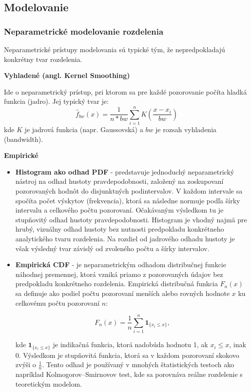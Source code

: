 \subsection{Modelovanie}

\subsubsection{Neparametrické modelovanie rozdelenia}\label{subsubsection:nonparametric_models}

Neparametrické prístupy modelovania sú typické tým, že nepredpokladajú konkrétny tvar rozdelenia.

\textbf{Vyhladené (angl. Kernel Smoothing)}\label{textbf:kernel_smoothing}

Ide o neparametrický prístup, pri ktorom sa pre každé pozorovanie počíta hladká funkcia (jadro). Jej typický tvar je:
\begin{equation}
\hat{f}_{bw}(x) = \frac{1}{n*bw} \sum_{i=1}^n K\left( \frac{x - x_i}{bw} \right)
\end{equation}
kde $K$ je jadrová funkcia (napr. Gaussovská) a $bw$ je rozsah vyhladenia (bandwidth).

\textbf{Empirické}

\begin{itemize}
  \item \textbf{Histogram ako odhad PDF} - predstavuje jednoduchý neparametrický nástroj na odhad hustoty pravdepodobnosti, založený na zoskupovaní pozorovaných hodnôt do disjunktných podintervalov. V každom intervale sa spočíta počet výskytov (frekvencia), ktorá sa následne normuje podľa šírky intervalu a celkového počtu pozorovaní. Očakávaným výsledkom tu je stupňovitý odhad hustoty pravdepodobnosti. Histogram je vhodný najmä pre hrubý, vizuálny odhad hustoty bez nutnosti predpokladu konkrétneho analytického tvaru rozdelenia. Na rozdiel od jadrového odhadu hustoty je však výsledný tvar závislý od zvoleného počtu a šírky intervalov.
  \item \textbf{Empirická CDF} - je neparametrickým odhadom distribučnej funkcie náhodnej premennej, ktorá vzniká priamo z pozorovaných údajov bez predpokladu konkrétneho rozdelenia. Empirická distribučná funkcia $F_n(x)$ sa definuje ako podiel počtu pozorovaní menších alebo rovných hodnote $x$ ku celkovému počtu pozorovaní $n$:
  
  \begin{equation}
  F_n(x) = \frac{1}{n} \sum_{i=1}^{n} \mathbf{1}_{\{x_i \leq x\}},
  \end{equation}

  kde $\mathbf{1}_{\{x_i \leq x\}}$ je indikačná funkcia, ktorá nadobúda hodnotu 1, ak $x_i \leq x$, inak 0. Výsledkom je stupňovitá funkcia, ktorá sa v každom pozorovaní skokovo zvýši o $\frac{1}{n}$. Tento odhad je používaný v mnohých štatistických testoch ako napríklad Kolmogorov–Smirnovov test, kde sa porovnáva reálne rozdelenie s teoretickým modelom.
\end{itemize}

